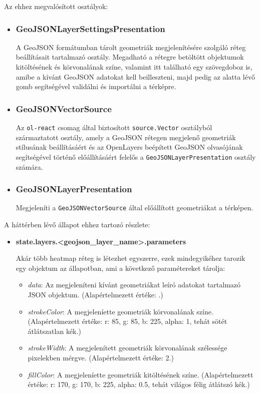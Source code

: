 \noindent Az ehhez megvalósított osztályok:
\begin{itemize}

\item\subsubsection{GeoJSONLayerSettingsPresentation}
A GeoJSON formátumban tárolt geometriák megjelenítésére szolgáló réteg
beállításait tartalmazó osztály. Megadható a rétegre betöltött objektumok
kitöltésének és körvonalának színe, valamint itt található egy szövegdoboz is,
amibe a kívánt GeoJSON adatokat kell beilleszteni, majd pedig az alatta lévő
gomb segítségével validálni és importálni a térképre.

\item\subsubsection{GeoJSONVectorSource}
Az \verb|ol-react| csomag által biztosított \verb|source.Vector| osztályból
származtatott osztály, amely a GeoJSON rétegen megjelenő geometriák stílusának
beállításáért és az OpenLayers beépített GeoJSON olvasójának segítségével
történő előállításáért felelős a \verb|GeoJSONLayerPresentation| osztály
számára.

\item\subsubsection{GeoJSONLayerPresentation}
Megjeleníti a \verb|GeoJSONVectorSource| által előállított geometriákat a
térképen.

\end{itemize}
\noindent A háttérben lévő állapot ehhez tartozó részlete:
\begin{itemize}

  \item \textbf{state.layers.<geojson\_layer\_name>.parameters}

  Akár több heatmap réteg is létezhet egyszerre, ezek mindegyikéhez tarozik egy
  objektum az állapotban, ami a következő paramétereket tárolja:

  \begin{itemize}
  \item \textit{data}:
    Az megjeleníteni kívánt geometriákat leíró adatokat tartalmazó JSON
    objektum.
    (Alapértelmezett értéke: {}.)
  \item \textit{strokeColor}:
    A megjeleníette geometriák körvonalának színe.
    (Alapértelmezett értéke: {r: 85, g: 85, b: 225, alpha: 1}, tehát sötét
    átlátszatlan kék.)
  \item \textit{strokeWidth}:
    A megjelenített geometriák körvonalának szélessége pixelekben mérgve.
    (Alapértelmezett értéke: 2.)
  \item \textit{fillColor}:
    A megjeleníette geometriák kitöltésének színe.
    (Alapértelmezett értéke: {r: 170, g: 170, b: 225, alpha: 0.5}, tehát világos
    félig átlátszó kék.)
  \end{itemize}

\end{itemize}

